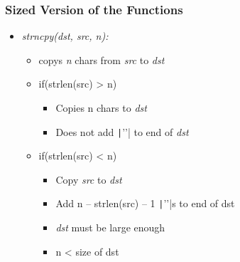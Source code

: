 \documentclass{../c-lecture}
\begin{document}
\begin{frame}
  \frametitle{Sized Version of the Functions}
  \begin{itemize}
    \item \textit{\color{YellowOrange} strncpy(dst, src, n):}
    \begin{itemize}
      \item
        copys \textit{\color{RubineRed} n} chars from
        \textit{\color{Cyan} src} to \textit{\color{Melon} dst}

      \item if(strlen(src) > n)
      \begin{itemize}
        \item Copies n chars to \textit{\color{Melon} dst}
        \item
          Does not add \texttt|'\0'| to end of \textit{\color{Melon} dst}

      \end{itemize}
      \item if(strlen(src) < n)
      \begin{itemize}
        \item
          Copy \textit{\color{Cyan} src} to
          \textit{\color{Melon} dst}

        \item
          Add n – strlen(src) – 1 \texttt|'\0'|s to end of
          dst

        \item \textit{\color{Melon} dst} must be large enough
        \item n < size of dst
      \end{itemize}
    \end{itemize}
  \end{itemize}
\end{frame}
\end{document}
